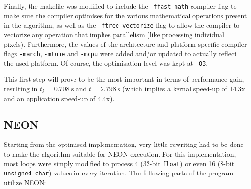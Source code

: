\documentclass[final]{article}
\begin{document}
Finally, the makefile was modified to include the \texttt{-ffast-math} compiler flag to make sure the compiler optimises for the various mathematical operations present in the algorithm, as well as the \texttt{-ftree-vectorize} flag to allow the compiler to vectorize any operation that implies parallelism (like processing individual pixels).
Furthermore, the values of the architecture and platform specific compiler flags \texttt{-march}, \texttt{-mtune} and \texttt{-mcpu} were added and/or updated to actually reflect the used platform.
Of course, the optimisation level was kept at \texttt{-O3}.

This first step will prove to be the most important in terms of performance gain, resulting in $t_k = \SI{0.708}{\second}$ and $t = \SI{2.798}{\second}$ (which implies a kernal speed-up of 14.3x and an application speed-up of 4.4x).

\subsection{NEON}
Starting from the optimised implementation, very little rewriting had to be done to make the algorithm suitable for NEON execution.
For this implementation, most loops were simply modified to process 4 (32-bit \texttt{float}) or even 16 (8-bit \texttt{unsigned char}) values in every iteration.
The following parts of the program utilize NEON:
\end{document}
